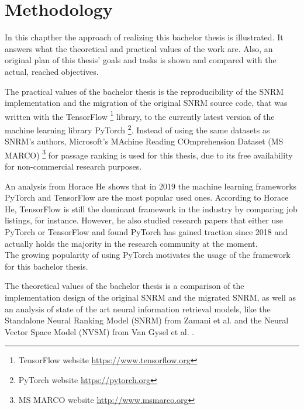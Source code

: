\chapter{Methodology}

In this chapther the approach of realizing this bachelor thesis is illustrated.
It answers what the theoretical and practical values of the work are.
Also, an original plan of this thesis' goals and tasks is shown and compared with the
    actual, reached objectives.

The practical values of the bachelor thesis is the reproducibility of
    the SNRM implementation and the migration of the original SNRM source 
    code, that was written with the TensorFlow
    \footnote{TensorFlow website \url{https://www.tensorflow.org}}
    library, 
    to the currently latest version of the machine learning
    library PyTorch \footnote{PyTorch website \url{https://pytorch.org}}.
Instead of using the same datasets as SNRM's authors,
    Microsoft's MAchine Reading COmprehension Dataset (MS MARCO)
    \footnote{MS MARCO website \url{http://www.msmarco.org}}
    for passage ranking is used for this thesis,
    due to its free availability for non-commercial research purposes.

An analysis from Horace He \cite{he:2019:state-of-ml-frameworks} shows that 
    in 2019 the machine learning frameworks PyTorch and TensorFlow 
    are the most popular used ones.
According to Horace He, TensorFlow is still the dominant framework
    in the industry by comparing job listings, for instance.
However, he also studied research papers that either use PyTorch or
    TensorFlow and found PyTorch has gained traction since 2018 and
    actually holds the majority in the research community at the moment.
    \cite{he:2019:state-of-ml-frameworks}\\
The growing popularity of using PyTorch motivates the usage of the 
    framework for this bachelor thesis.

The theoretical values of the bachelor thesis is a comparison of the 
    implementation design of the original SNRM and the migrated SNRM, 
    as well as an analysis of state of the art neural information retrieval models,
    like the Standalone Neural Ranking Model (SNRM) 
    from Zamani et al. \cite{zamani:2018:from-neural-reranking-to-neural-ranking} 
    and the Neural Vector Space Model (NVSM) 
    from Van Gysel et al. \cite{van-gysel:2017:neural-vector-spaces}.

